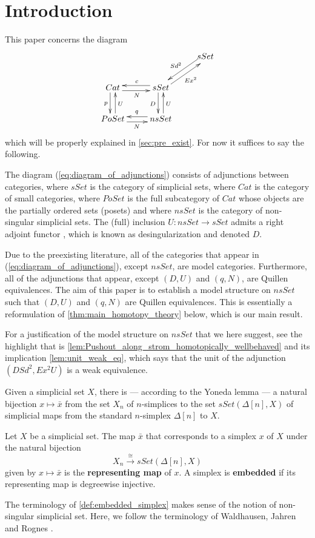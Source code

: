 

\section{Introduction}
\label{sec:intro_hty}

\noindent This paper concerns the diagram
\begin{equation}
\label{eq:diagram_of_adjunctions}
\begin{gathered}
\xymatrix{
&& sSet \ar@<-.7ex>[ld]_{Sd^2} \\
Cat \ar@<-.7ex>[d]_p \ar@<-.7ex>[r]_N & sSet \ar@<-.7ex>[ur]_{Ex^2} \ar@<-.7ex>[l]_c \ar@<-.7ex>[d]_D \\
PoSet \ar@<-.7ex>[u]_U \ar@<-.7ex>[r]_N & nsSet \ar@<-.7ex>[l]_q \ar@<-.7ex>[u]_U
}
\end{gathered}
\end{equation}
which will be properly explained in \cref{sec:pre_exist}. For now it suffices to say the following.

The diagram (\ref{eq:diagram_of_adjunctions}) consists of adjunctions between categories, where $sSet$ is the category of simplicial sets, where $Cat$ is the category of small categories, where $PoSet$ is the full subcategory of $Cat$ whose objects are the partially ordered sets (posets) and where $nsSet$ is the category of non-singular simplicial sets. The (full) inclusion $U:nsSet\to sSet$ admits a right adjoint functor \cite[Rem.~2.2.12]{WJR13}, which is known as desingularization and denoted $D$.

Due to the preexisting literature, all of the categories that appear in (\ref{eq:diagram_of_adjunctions}), except $nsSet$, are model categories. Furthermore, all of the adjunctions that appear, except $(D,U)$ and $(q,N)$, are Quillen equivalences. The aim of this paper is to establish a model structure on $nsSet$ such that $(D,U)$ and $(q,N)$ are Quillen equivalences. This is essentially a reformulation of \cref{thm:main_homotopy_theory} below, which is our main result.

For a justification of the model structure on $nsSet$ that we here suggest, see the highlight that is \cref{lem:Pushout_along_strom_homotopically_wellbehaved} and its implication \cref{lem:unit_weak_eq}, which says that the unit of the adjunction $(DSd^2,Ex^2U)$ is a weak equivalence.

Given a simplicial set $X$, there is --- according to the Yoneda lemma --- a natural bijection $x\mapsto \bar{x}$ from the set $X_n$ of $n$-simplices to the set $sSet(\Delta [n],X)$ of simplicial maps from the standard $n$-simplex $\Delta [n]$ to $X$.
\begin{definition}\label{def:embedded_simplex}
Let $X$ be a simplicial set. The map $\bar{x}$ that corresponds to a simplex $x$ of $X$ under the natural bijection
\[X_n\xrightarrow{\cong } sSet(\Delta [n],X)\]
given by $x\mapsto \bar{x}$ is the \textbf{representing map} of $x$. A simplex is \textbf{embedded} if its representing map is degreewise injective.
\end{definition}
\noindent The terminology of \cref{def:embedded_simplex} makes sense of the notion of non-singular simplicial set. Here, we follow the terminology of Waldhausen, Jahren and Rognes \cite[Def.~1.2.2, p.~14]{WJR13}.

